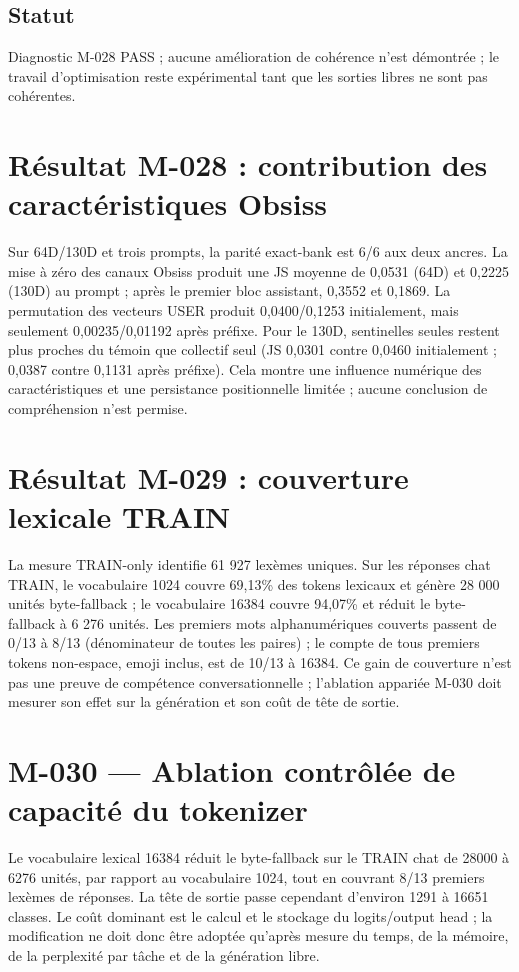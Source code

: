 \documentclass[11pt,a4paper]{report}
\begin{document}
\subsection{Statut}
Diagnostic M-028 PASS ; aucune amélioration de cohérence n'est démontrée ; le travail d'optimisation reste expérimental tant que les sorties libres ne sont pas cohérentes.

\section{Résultat M-028 : contribution des caractéristiques Obsiss}
Sur 64D/130D et trois prompts, la parité exact-bank est 6/6 aux deux ancres. La mise à zéro des canaux Obsiss produit une JS moyenne de 0,0531 (64D) et 0,2225 (130D) au prompt ; après le premier bloc assistant, 0,3552 et 0,1869. La permutation des vecteurs USER produit 0,0400/0,1253 initialement, mais seulement 0,00235/0,01192 après préfixe. Pour le 130D, sentinelles seules restent plus proches du témoin que collectif seul (JS 0,0301 contre 0,0460 initialement ; 0,0387 contre 0,1131 après préfixe). Cela montre une influence numérique des caractéristiques et une persistance positionnelle limitée ; aucune conclusion de compréhension n'est permise.

\section{Résultat M-029 : couverture lexicale TRAIN}
La mesure TRAIN-only identifie 61 927 lexèmes uniques. Sur les réponses chat TRAIN, le vocabulaire 1024 couvre 69,13\% des tokens lexicaux et génère 28 000 unités byte-fallback ; le vocabulaire 16384 couvre 94,07\% et réduit le byte-fallback à 6 276 unités. Les premiers mots alphanumériques couverts passent de 0/13 à 8/13 (dénominateur de toutes les paires) ; le compte de tous premiers tokens non-espace, emoji inclus, est de 10/13 à 16384. Ce gain de couverture n'est pas une preuve de compétence conversationnelle ; l'ablation appariée M-030 doit mesurer son effet sur la génération et son coût de tête de sortie.

\section{M-030 — Ablation contrôlée de capacité du tokenizer}
Le vocabulaire lexical 16384 réduit le byte-fallback sur le TRAIN chat de 28000 à 6276 unités, par rapport au vocabulaire 1024, tout en couvrant 8/13 premiers lexèmes de réponses. La tête de sortie passe cependant d'environ 1291 à 16651 classes. Le coût dominant est le calcul et le stockage du logits/output head ; la modification ne doit donc être adoptée qu'après mesure du temps, de la mémoire, de la perplexité par tâche et de la génération libre.
\end{document}

